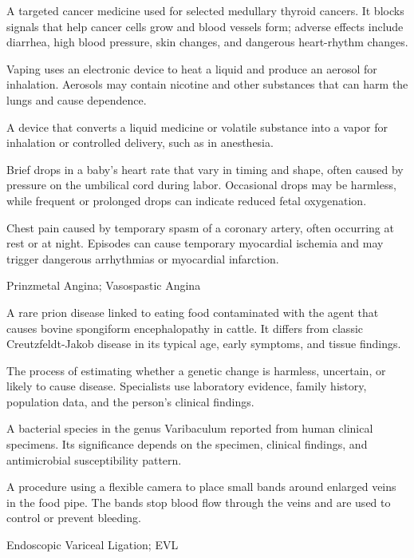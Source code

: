  A targeted cancer medicine used for selected medullary thyroid cancers. It blocks signals that help cancer cells grow and blood vessels form; adverse effects include diarrhea, high blood pressure, skin changes, and dangerous heart-rhythm changes.

 Vaping uses an electronic device to heat a liquid and produce an aerosol for inhalation. Aerosols may contain nicotine and other substances that can harm the lungs and cause dependence.

 A device that converts a liquid medicine or volatile substance into a vapor for inhalation or controlled delivery, such as in anesthesia.

 Brief drops in a baby’s heart rate that vary in timing and shape, often caused by pressure on the umbilical cord during labor. Occasional drops may be harmless, while frequent or prolonged drops can indicate reduced fetal oxygenation.

 Chest pain caused by temporary spasm of a coronary artery, often occurring at rest or at night. Episodes can cause temporary myocardial ischemia and may trigger dangerous arrhythmias or myocardial infarction.

\synonyms
Prinzmetal Angina; Vasospastic Angina

 A rare prion disease linked to eating food contaminated with the agent that causes bovine spongiform encephalopathy in cattle. It differs from classic Creutzfeldt-Jakob disease in its typical age, early symptoms, and tissue findings.

 The process of estimating whether a genetic change is harmless, uncertain, or likely to cause disease. Specialists use laboratory evidence, family history, population data, and the person’s clinical findings.

 A bacterial species in the genus Varibaculum reported from human clinical specimens. Its significance depends on the specimen, clinical findings, and antimicrobial susceptibility pattern.

 A procedure using a flexible camera to place small bands around enlarged veins in the food pipe. The bands stop blood flow through the veins and are used to control or prevent bleeding.

\synonyms
Endoscopic Variceal Ligation; EVL

